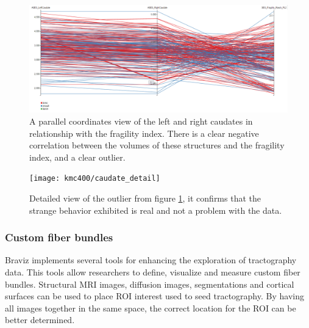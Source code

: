 \begin{figure}
	\centering
		\includegraphics[width=\textwidth]{figures/kmc400/caudate_parallel}
	\caption{A parallel coordinates view of the left and right caudates in relationship with the fragility index. There is a clear negative correlation between the volumes of these structures and the fragility index, and a clear outlier.}
	\label{fig_caudate_parallel}
\end{figure}


\begin{figure}
	\centering
		\texttt{[image: kmc400/caudate\_detail]}
	\caption{Detailed view of the outlier from figure \ref{fig_caudate_parallel}, it confirms that the strange behavior exhibited is real and not a problem with the data.}
	\label{fig_asymetric_caudate_detail}
\end{figure}

\subsubsection{Custom fiber bundles}

Braviz implements several tools for enhancing the exploration of tractography data. This tools allow researchers to define, visualize and measure custom fiber bundles. Structural MRI images, diffusion images, segmentations and cortical surfaces can be used to place ROI interest used to seed tractography. By having all images together in the same space, the correct location for the ROI can be better determined. 

 





